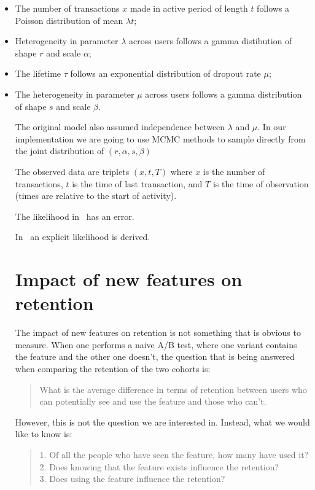 \documentclass{tufte-book}
\begin{document}
\begin{itemize}
\item The number of transactions $x$ made in active period of length
  $t$ follows a Poisson distribution of mean $\lambda t$;
\item Heterogeneity in parameter $\lambda$ across users follows a
  gamma distibution of shape $r$ and scale $\alpha$;
\item The lifetime $\tau$ follows an exponential distribution of
  dropout rate $\mu$;
\item The heterogeneity in parameter $\mu$ across users follows a
  gamma distribution of shape $s$ and scale $\beta$.

The original model also assumed independence between $\lambda$ and
$\mu$. In our implementation we are going to use MCMC methods to
sample directly from the joint distribution of $(r,\alpha,s,\beta)$

The observed data are triplets $(x,t,T)$ where $x$ is the number of
transactions, $t$ is the time of last transaction, and $T$ is the time
of observation (times are relative to the start of activity).

The likelihood in~\cite{Fader2005} has an error.

In~\cite{Schmittlein1987} an explicit likelihood is derived.



  
  \section{Impact of new features on retention}

The impact of new features on retention is not something that is obvious to
measure. When one performs a naive A/B test, where one variant contains the
feature and the other one doesn't, the question that is being answered when
comparing the retention of the two cohorts is:

\begin{quotation}
	What is the average difference in terms of retention between users who
	can potentially see and use the feature and those who can't.
\end{quotation}

However, this is not the question we are interested in. Instead, what we would
like to know is:

\begin{quotation}
    1. Of all the people who have seen the feature, how many have used it?\\
    2. Does knowing that the feature exists influence the retention?\\
    3. Does using the feature influence the retention?
\end{quotation}


\end{itemize}
\end{document}

